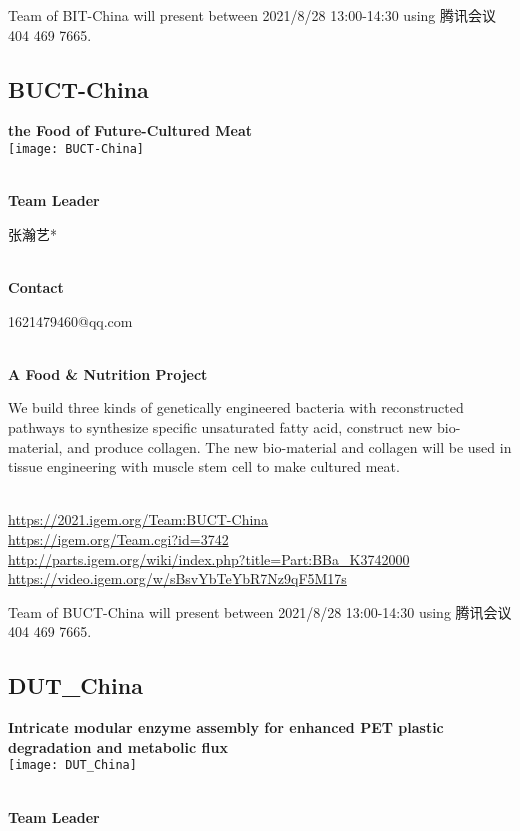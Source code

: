 Team of BIT-China will present between      2021/8/28 13:00-14:30   using 腾讯会议 404 469 7665.
\newpage


\subsection{\textcolor{Blu}{ BUCT-China } }
\vspace{5mm}
\begin{center}
\large{
  \textbf{ the Food of Future-Cultured Meat }\\

  \texttt{[image: BUCT-China]}
}
\end{center}
\textbf{\\Team Leader}

  张瀚艺*


\textbf{\\Contact}

  1621479460@qq.com


\textbf{\\A Food & Nutrition Project\\}\begin{spacing}{1.5}

We build three kinds of genetically engineered bacteria with reconstructed pathways to synthesize specific unsaturated fatty acid, construct new bio-material, and produce collagen. The new bio-material and collagen will be used in tissue engineering with muscle stem cell to make cultured meat.\end{spacing}
\\

\url{https://2021.igem.org/Team:BUCT-China }\\
\url{https://igem.org/Team.cgi?id=3742 }\\
\url{http://parts.igem.org/wiki/index.php?title=Part:BBa_K3742000 }\\
\url{https://video.igem.org/w/sBsvYbTeYbR7Nz9qF5M17s }\\

\vfill{}









Team of BUCT-China will present between      2021/8/28 13:00-14:30   using 腾讯会议 404 469 7665.
\newpage


\subsection{\textcolor{Blu}{ DUT\_China } }
\vspace{5mm}
\begin{center}
\large{
  \textbf{ Intricate modular enzyme assembly for enhanced PET plastic degradation and metabolic flux }\\

  \texttt{[image: DUT\_China]}
}
\end{center}
\textbf{\\Team Leader}

